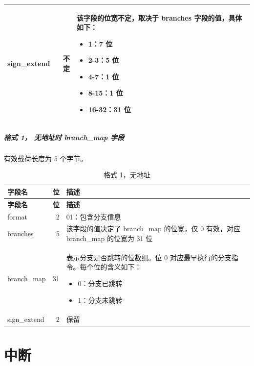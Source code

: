 \documentclass[main\_\_CN.tex]{subfiles}
\begin{document}
\begin{longtable}[c]{ |l|r|L{10cm}| }
    sign\_extend & 不定 & 该字段的位宽不定，取决于 branches 字段的值，具体如下：
    \begin{itemize}
        \item 1：7 位
        \item 2-3：5 位
        \item 4-7：1 位
        \item 8-15：1 位
        \item 16-32：31 位
    \vspace{-1.5em}
    \end{itemize}
    \\\hline
 \end{longtable}

 \subparagraph{格式 1， 无地址时 branch\_map 字段}

有效载荷长度为 5 个字节。
\begin{longtable}[c]{ |l|r|L{10cm}| }
    \caption{格式 1，无地址}
    \label{tab:f1}
    \\\hline{}
    \textbf{字段名} & \textbf{位} & \textbf{描述} \\\hline
    \endfirsthead
    \textbf{字段名} & \textbf{位} & \textbf{描述} \\\hline
    \endhead
    \endfoot
    \endlastfoot

    format & 2 & 01：包含分支信息 \\\hline
    branches & 5 & 该字段的值决定了 branch\_map 的位宽，仅 0 有效，对应 branch\_map 的位宽为 31 位 \\\hline

    branch\_map & 31 & 表示分支是否跳转的位数组。位 0 对应最早执行的分支指令。每个位的含义如下：
    \begin{itemize}
        \item 0：分支已跳转
        \item 1：分支未跳转
    \vspace{-1.5em}
    \end{itemize}
    \\\hline

    sign\_extend & 2 & 保留 \\\hline
 \end{longtable}


\section{中断}
\end{document}
